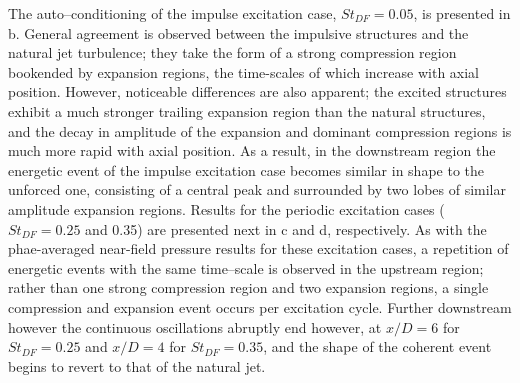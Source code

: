 The auto--conditioning of the impulse excitation case, $St_{DF} = 0.05$, is presented in b.
General agreement is observed between the impulsive structures and the natural jet turbulence; they take the form of a strong compression region bookended by expansion regions, the time-scales of which increase with axial position.
However, noticeable differences are also apparent; the excited structures exhibit a much stronger trailing expansion region than the natural structures, and the decay in amplitude of the expansion and dominant compression regions is much more rapid with axial position.
As a result, in the downstream region the energetic event of the impulse excitation case becomes similar in shape to the unforced one, consisting of a central peak and surrounded by two lobes of similar amplitude expansion regions.
Results for the periodic excitation cases ($St_{DF} = 0.25$ and 0.35) are presented next in c and d, respectively.
As with the phae-averaged near-field pressure results for these excitation cases, a repetition of energetic events with the same time--scale is observed in the upstream region; rather than one strong compression region and two expansion regions, a single compression and expansion event occurs per excitation cycle.
Further downstream however the continuous oscillations abruptly end however, at $x/D = 6$ for $St_{DF} =0.25$ and $x/D = 4$ for $St_{DF} =0.35$, and the shape of the coherent event begins to revert to that of the natural jet.

